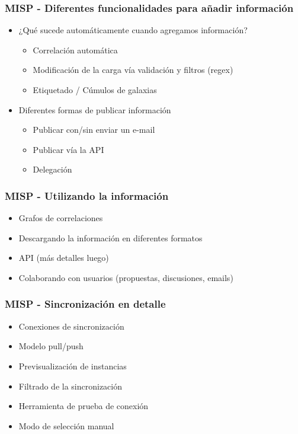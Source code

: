 \begin{frame}
    \frametitle{MISP - Diferentes funcionalidades para añadir información}
    \begin{itemize}
        \item ¿Qué sucede automáticamente cuando agregamos información? 
        \begin{itemize}
            \item Correlación automática
            \item Modificación de la carga vía validación y filtros (regex)
            \item Etiquetado / Cúmulos de galaxias
        \end{itemize}
        \item Diferentes formas de publicar información
        \begin{itemize}
            \item Publicar con/sin enviar un e-mail
            \item Publicar vía la API
            \item Delegación
        \end{itemize}
    \end{itemize}
\end{frame}

\begin{frame}
    \frametitle{MISP - Utilizando la información}
    \begin{itemize}
        \item Grafos de correlaciones
        \item Descargando la información en diferentes formatos
        \item API (más detalles luego)
        \item Colaborando con usuarios (propuestas, discusiones, emails)
    \end{itemize}
\end{frame}

\begin{frame}
    \frametitle{MISP - Sincronización en detalle}
    \begin{itemize}
        \item Conexiones de sincronización
        \item Modelo pull/push
        \item Previsualización de instancias
        \item Filtrado de la sincronización
        \item Herramienta de prueba de conexión
        \item Modo de selección manual
    \end{itemize}
\end{frame}

